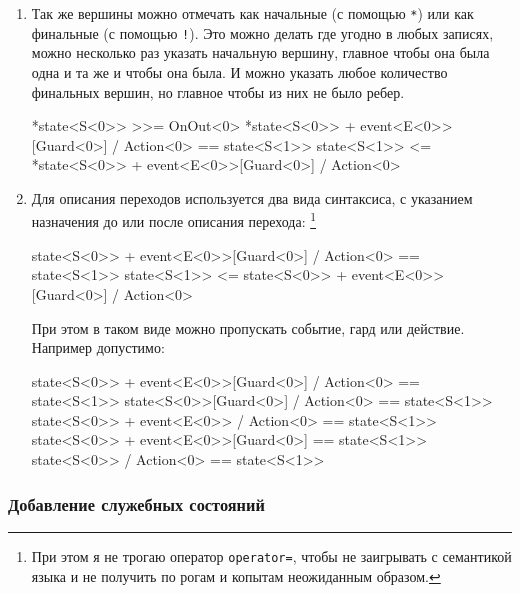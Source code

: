 \documentclass{article}
\begin{document}
{\begin{enumerate}
\item Так же вершины можно отмечать как начальные (с помощью \verb"*") или как финальные (с помощью \verb"!").
Это можно делать где угодно в любых записях, можно несколько раз указать начальную вершину, главное чтобы она была одна и та же и чтобы она была.
И можно указать любое количество финальных вершин, но главное чтобы из них не было ребер.
\begin{cppcode}[\nonumbers]
*state<S<0>> >>= OnOut<0>
*state<S<0>> + event<E<0>>[Guard<0>] / Action<0> == state<S<1>>
state<S<1>> <= *state<S<0>> + event<E<0>>[Guard<0>] / Action<0>
\end{cppcode}

\item Для описания переходов используется два вида синтаксиса, с указанием назначения до или после описания перехода:%
\footnote{При этом я не трогаю оператор \texttt{operator=}, чтобы не заигрывать с семантикой языка и не получить по рогам и копытам неожиданным образом.}
\begin{cppcode}[\nonumbers]
state<S<0>> + event<E<0>>[Guard<0>] / Action<0> == state<S<1>>
state<S<1>> <= state<S<0>> + event<E<0>>[Guard<0>] / Action<0>
\end{cppcode}
При этом в таком виде можно пропускать событие, гард или действие.
Например допустимо:
\begin{cppcode}[\nonumbers]
state<S<0>> + event<E<0>>[Guard<0>] / Action<0> == state<S<1>>
state<S<0>>[Guard<0>] / Action<0> == state<S<1>>
state<S<0>> + event<E<0>> / Action<0> == state<S<1>>
state<S<0>> + event<E<0>>[Guard<0>] == state<S<1>>
state<S<0>> / Action<0> == state<S<1>>
\end{cppcode}
\end{enumerate}

\subsubsection{Добавление служебных состояний}

}
\end{document}

